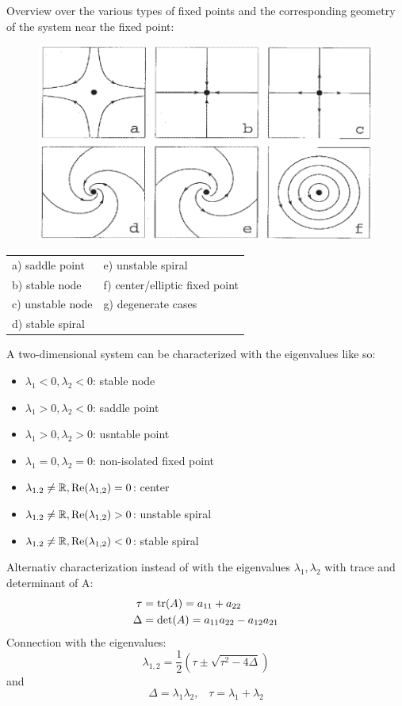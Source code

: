 Overview over the various types of fixed points and the corresponding geometry of the system near the fixed point:
\begin{figure}[H]
  \centering
  \includegraphics[width=.7\linewidth]{Pics/4.18.png}
\end{figure}

\begin{table}[H]
  \footnotesize
  \begin{tabular}{ll}
    a) saddle point    & e) unstable spiral\\
    b) stable node     & f) center/elliptic fixed point\\
    c) unstable node   & g) degenerate cases\\
    d) stable spiral   &
  \end{tabular}
\end{table}

A two-dimensional system can be characterized with the eigenvalues like so:
\begin{itemize}
  \item $\lambda_1 < 0, \lambda_2 < 0$: stable node
  \item $\lambda_1 > 0, \lambda_2 < 0$: saddle point
  \item $\lambda_1 > 0, \lambda_2 > 0$: usntable point
  \item $\lambda_1 = 0, \lambda_2 = 0$: non-isolated fixed point
  \item $\lambda_{1.2} \neq \mathbb{R}, \textup{Re}(\lambda_{1,2}) = 0$: center
  \item $\lambda_{1.2} \neq \mathbb{R}, \textup{Re}(\lambda_{1,2}) > 0$: unstable spiral
  \item $\lambda_{1.2} \neq \mathbb{R}, \textup{Re}(\lambda_{1,2}) < 0$: stable spiral
\end{itemize}

Alternativ characterization instead of with the eigenvalues $\lambda_1, \lambda_2$ with trace and determinant of A:
\begin{equation}
  \begin{split}
    \tau &= \textup{tr}(A) = a_{11} + a_{22}\\
    \Delta &= \textup{det}(A) = a_{11}a_{22} - a_{12}a_{21}
  \end{split}
\end{equation}
Connection with the eigenvalues:
\begin{equation}
  \lambda_{1,2} = \frac{1}{2}\left(\tau \pm \sqrt{\tau^2 - 4\Delta}\right)
\end{equation}
and
\begin{equation}
  \Delta = \lambda_1 \lambda_2, \;\;\; \tau = \lambda_1 + \lambda_2
\end{equation}

